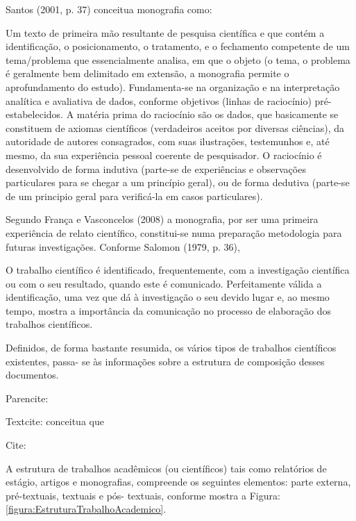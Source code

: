 \begin{Desenvolvimento}
Santos (2001, p. 37) conceitua monografia como:
\begin{citacaodireta}
Um texto de primeira mão resultante de pesquisa científica e que contém a identificação, o posicionamento, o tratamento, e o fechamento competente de um tema/problema que essencialmente analisa, em que o objeto (o tema, o problema é geralmente bem delimitado em extensão, a monografia permite o aprofundamento do estudo). Fundamenta-se na organização e na interpretação analítica e avaliativa de dados, conforme objetivos (linhas de raciocínio) pré-estabelecidos. A matéria prima do raciocínio são os dados, que basicamente se constituem de axiomas científicos (verdadeiros aceitos por diversas ciências), da autoridade de autores consagrados, com suas ilustrações, testemunhos e, até mesmo, da sua experiência pessoal coerente de pesquisador. O raciocínio é desenvolvido de forma indutiva (parte-se de experiências e observações particulares para se chegar a um princípio geral), ou de forma dedutiva (parte-se de um principio geral para verificá-la em casos particulares).
\end{citacaodireta}

Segundo França e Vasconcelos (2008) a monografia, por ser uma primeira experiência de relato científico, constitui-se numa preparação metodologia para futuras investigações. Conforme Salomon (1979, p. 36),

\begin{citacaodireta}
O trabalho científico é identificado, frequentemente, com a investigação científica ou com o seu resultado, quando este é comunicado. Perfeitamente válida a identificação, uma vez que dá à investigação o seu devido lugar e, ao mesmo tempo, mostra a importância da comunicação no processo de elaboração dos trabalhos científicos.
\end{citacaodireta}

\parencite{knuth1984}
Definidos, de forma bastante resumida, os vários tipos de trabalhos científicos existentes, passa- se às informações sobre a estrutura de composição desses documentos.

Parencite: \parencite{santos2001}

Textcite: \textcite[36]{santos2001} conceitua que 

Cite: \cite{santos2001}

A estrutura de trabalhos acadêmicos (ou científicos) tais como relatórios de estágio, artigos e monografias, compreende os seguintes elementos: parte externa, pré-textuais, textuais e pós- textuais, conforme mostra a Figura: \ref{figura:EstruturaTrabalhoAcademico}.


\end{Desenvolvimento}
